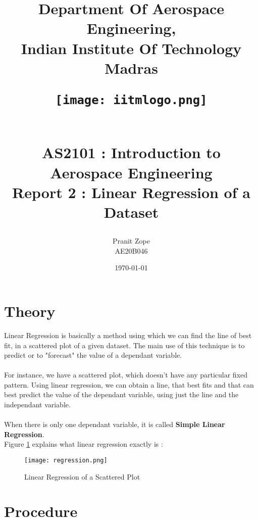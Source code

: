 \documentclass[12pt]{article}
\title{
    Department Of Aerospace Engineering,\\
    Indian Institute Of Technology Madras
    \begin{figure}[H]
        \centering
        \texttt{[image: iitmlogo.png]}
    \end{figure}
    \begin{center}
        \textbf{\\AS2101 : Introduction to Aerospace Engineering\\}
        Report 2 : Linear Regression of a Dataset\\
    \end{center}
}
\author{
    Pranit Zope\\AE20B046
}
\date{\today}
\begin{document}
\maketitle
\newpage
{}
\tableofcontents 
\listoffigures
\listoftables
\newpage

\section{Theory}
    Linear Regression is basically a method using which we can find the line of best fit, in a scattered plot of a given dataset.
    The main use of this technique is to predict or to "forecast" the value of a dependant variable.\\
    \\For instance, we have a scattered plot, which doesn't have any particular fixed pattern. Using linear regression, we can obtain a line, that best fits and that can best predict the value of the dependant variable, using just the line and the independant variable.\\
    \\When there is only one dependant variable, it is called \textbf{Simple Linear Regression}.\\
    Figure \ref{fig:regression} explains what linear regression exactly is :
    \begin{figure}[!h]
        \centering
        \texttt{[image: regression.png]}
        \caption{Linear Regression of a Scattered Plot}
        \label{fig:regression}
    \end{figure}
    
\section{Procedure}
    
\end{document}
